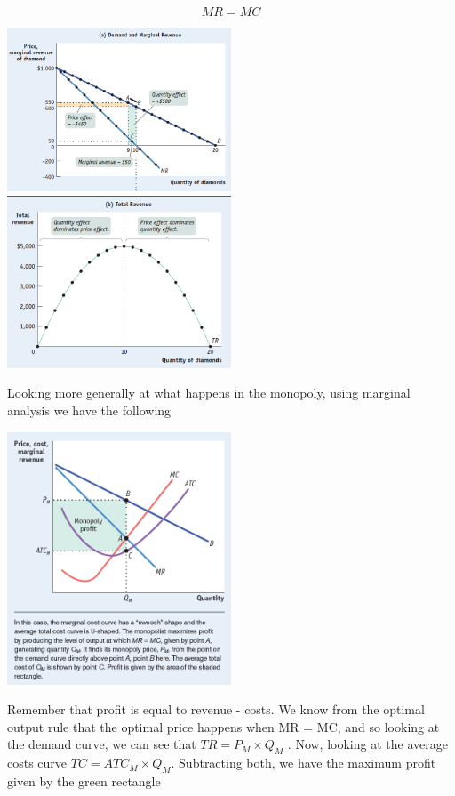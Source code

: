 \documentclass[english,course,draft]{Notes}
\begin{document}
$$\boxed{MR = MC}$$


\includegraphics[width=0.5\textwidth, height=0.5\textwidth]{mon}
\includegraphics[width=0.5\textwidth, height=0.5\textwidth]{mon2}

\par{Looking more generally at what happens in the monopoly, using marginal analysis we have the following}

\includegraphics[width=0.5\textwidth, height=0.5\textwidth]{mon3}

\par{Remember that profit is equal to revenue - costs. We know from the optimal output rule that the optimal price happens when MR = MC, and so looking at the demand curve, we can see that $TR = P_{M} \times Q_{M}$ . Now, looking at the average costs curve $TC = ATC_{M} \times Q_{M}$. Subtracting both, we have the maximum profit given by the green rectangle}
\end{document}

